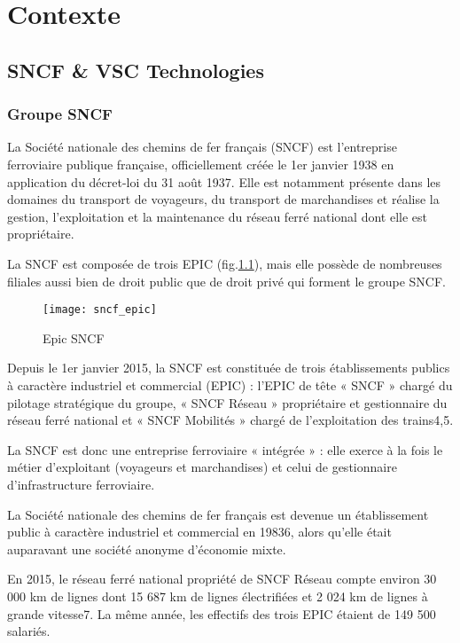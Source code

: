 \chapter{Contexte}

\section{SNCF \& VSC Technologies}
\subsection{Groupe SNCF}
La Société nationale des chemins de fer français (SNCF) est l'entreprise ferroviaire publique française, officiellement créée le 1er janvier 1938 en application du décret-loi du 31 août 1937. Elle est notamment présente dans les domaines du transport de voyageurs, du transport de marchandises et réalise la gestion, l'exploitation et la maintenance du réseau ferré national dont elle est propriétaire.

La SNCF est composée de trois EPIC (fig.\ref{fig:sncf_epic}), mais elle possède de nombreuses filiales aussi bien de droit public que de droit privé qui forment le groupe SNCF.

\begin{figure}[ht]
\centering
\texttt{[image: sncf\_epic]}
\caption{Epic SNCF}
\label{fig:sncf_epic}
\end{figure}

Depuis le 1er janvier 2015, la SNCF est constituée de trois établissements publics à caractère industriel et commercial (EPIC) : l'EPIC de tête « SNCF » chargé du pilotage stratégique du groupe, « SNCF Réseau » propriétaire et gestionnaire du réseau ferré national et « SNCF Mobilités » chargé de l'exploitation des trains4,5.

La SNCF est donc une entreprise ferroviaire « intégrée » : elle exerce à la fois le métier d'exploitant (voyageurs et marchandises) et celui de gestionnaire d'infrastructure ferroviaire.

La Société nationale des chemins de fer français est devenue un établissement public à caractère industriel et commercial en 19836, alors qu'elle était auparavant une société anonyme d'économie mixte.

En 2015, le réseau ferré national propriété de SNCF Réseau compte environ 30 000 km de lignes dont 15 687 km de lignes électrifiées et 2 024 km de lignes à grande vitesse7. La même année, les effectifs des trois EPIC étaient de 149 500 salariés.

